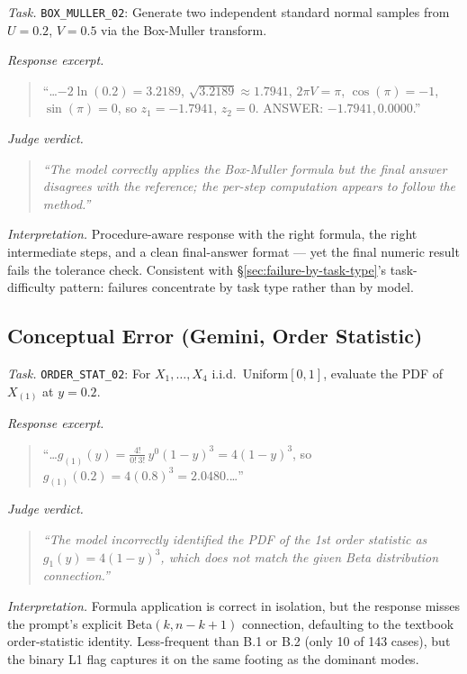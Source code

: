 \textit{Task.} \texttt{BOX\_MULLER\_02}: Generate two independent
standard normal samples from $U=0.2$, $V=0.5$ via the Box-Muller
transform.

\textit{Response excerpt.}
\begin{quote}\small
``\dots $-2\ln(0.2) = 3.2189$,
$\sqrt{3.2189} \approx 1.7941$, $2\pi V = \pi$,
$\cos(\pi) = -1$, $\sin(\pi) = 0$, so $z_1 = -1.7941$, $z_2 = 0$.
ANSWER: $-1.7941, 0.0000$.''
\end{quote}

\textit{Judge verdict.}
\begin{quote}\small\textit{
``The model correctly applies the Box-Muller formula but the final
answer disagrees with the reference; the per-step computation
appears to follow the method.''
}\end{quote}

\textit{Interpretation.} Procedure-aware response with the right
formula, the right intermediate steps, and a clean final-answer
format --- yet the final numeric result fails the tolerance check.
Consistent with \S\ref{sec:failure-by-task-type}'s task-difficulty
pattern: failures concentrate by task type rather than by model.

\subsection{Conceptual Error (Gemini, Order Statistic)}
\label{appendix:case-b3}

\textit{Task.} \texttt{ORDER\_STAT\_02}: For $X_1,\dots,X_4$ i.i.d.\
Uniform$[0,1]$, evaluate the PDF of $X_{(1)}$ at $y = 0.2$.

\textit{Response excerpt.}
\begin{quote}\small
``\dots $g_{(1)}(y) = \frac{4!}{0!\,3!}\, y^0 (1-y)^3 = 4(1-y)^3$,
so $g_{(1)}(0.2) = 4(0.8)^3 = 2.0480$.\dots''
\end{quote}

\textit{Judge verdict.}
\begin{quote}\small\textit{
``The model incorrectly identified the PDF of the 1st order
statistic as $g_1(y) = 4(1-y)^3$, which does not match the given
Beta distribution connection.''
}\end{quote}

\textit{Interpretation.} Formula application is correct in isolation,
but the response misses the prompt's explicit Beta$(k, n-k+1)$
connection, defaulting to the textbook order-statistic identity.
Less-frequent than B.1 or B.2 (only 10 of 143 cases), but the binary
L1 flag captures it on the same footing as the dominant modes.
